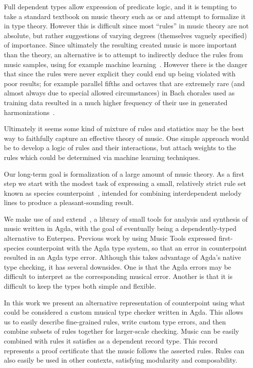 Full dependent types allow expression of predicate logic, and it is
tempting to take a standard textbook on music theory such as
\citet{piston-harmony} or \citet{aldwell2018harmony} and attempt to
formalize it in type theory. However this is difficult since most
``rules'' in music theory are not absolute, but rather suggestions of
varying degrees (themselves vaguely specified) of importance. Since
ultimately the resulting created music is more important than the
theory, an alternative is to attempt to indirectly deduce the rules
from music samples, using for example machine
learning~\citep{huang-cp}. However there is the danger that since
the rules were never explicit they could end up being violated with
poor results; for example parallel fifths and octaves that are
extremely rare (and almost always due to special allowed
circumstances) in Bach chorales used as training data resulted
in a much higher frequency of their use in generated
harmonizations~\citep{roberts-cp}.

Ultimately it seems some kind of mixture of rules and statistics may
be the best way to faithfully capture an effective theory of
music. One simple approach would be to develop a logic of rules and
their interactions, but attach weights to the rules which could be
determined via machine learning techniques.

Our long-term goal is formalization of a large amount of music theory.
As a first step we start with the modest task of expressing a small,
relatively strict rule set known as species
counterpoint~\cite{fux-cp}, intended for combining interdependent
melody lines to produce a pleasant-sounding result.

We make use of and extend~\citet{MusicTools}, a library of small tools
for analysis and synthesis of music written in Agda, with the goal of
eventually being a dependently-typed alternative to Euterpea.
Previous work by \citet{cong-cp} using Music Tools expressed
first-species counterpoint with the Agda type system, so that an error
in counterpoint resulted in an Agda type error. Although this takes
advantage of Agda's native type checking, it has several
downsides. One is that the Agda errors may be difficult to interpret
as the corresponding musical error. Another is that it is difficult to
keep the types both simple and flexible.

In this work we present an alternative representation of counterpoint
using what could be considered a custom musical type checker written
in Agda. This allows us to easily describe fine-grained rules, write
custom type errors, and then combine subsets of rules together for
larger-scale checking. Music can be easily combined with rules it
satisfies as a dependent record type. This record represents a proof
certificate that the music follows the asserted rules.
Rules can also easily be used in
other contexts, satisfying modularity and composability.

